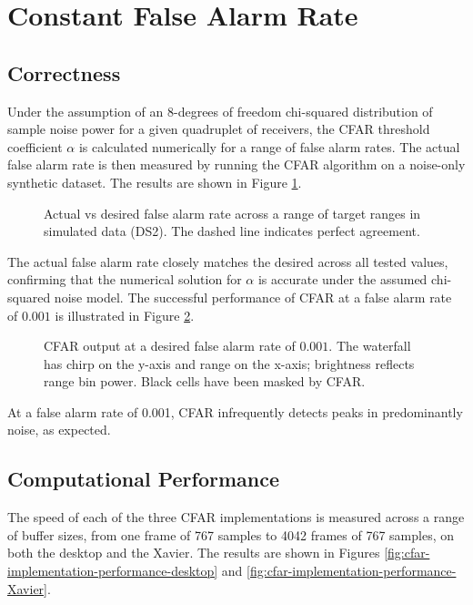 \FloatBarrier
\section{Constant False Alarm Rate}
\subsection{Correctness}
Under the assumption of an 8-degrees of freedom chi-squared distribution of sample noise
power for a given quadruplet of receivers, the CFAR threshold coefficient $\alpha$ is
calculated numerically for a range of false alarm rates. The actual false alarm rate is
then measured by running the CFAR algorithm on a noise-only synthetic dataset. The results
are shown in Figure \ref{fig:alpha-cfar-results}.

\begin{figure}[htbp]
    \centering
    \caption[Actual vs desired false alarm rate validating the numerical CFAR threshold.]{Actual
    vs desired false alarm rate across a range of target ranges in simulated data (DS2). The dashed line indicates
    perfect agreement.}
    \label{fig:alpha-cfar-results}
\end{figure}

The actual false alarm rate closely matches the desired across all tested values, confirming
that the numerical solution for $\alpha$ is accurate under the assumed chi-squared noise
model. The successful performance of CFAR at a false alarm rate of \(0.001\) is illustrated
in Figure \ref{fig:cfar-0.001-waterfall}.

\begin{figure}[htbp]
    \centering
    \caption[CFAR waterfall at false alarm rate of 0.001.]{CFAR output at a desired false
    alarm rate of \(0.001\). The waterfall has chirp on the y-axis and range on the x-axis;
    brightness reflects range bin power. Black cells have been masked by CFAR.}
    \label{fig:cfar-0.001-waterfall}
\end{figure}

At a false alarm rate of 0.001, CFAR infrequently detects peaks in predominantly noise, as
expected.

\subsection{Computational Performance}
The speed of each of the three CFAR implementations is measured across a range of buffer
sizes, from one frame of 767 samples to 4042 frames of 767 samples, on both the desktop
and the Xavier. The results are shown in Figures
\ref{fig:cfar-implementation-performance-desktop} and
\ref{fig:cfar-implementation-performance-Xavier}.

